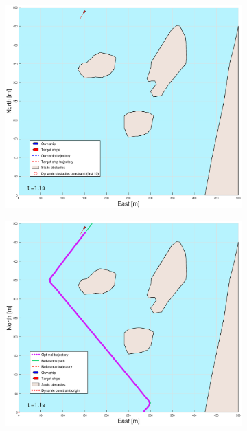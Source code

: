 \clearpage
\begin{figure}[!b] %
    \begin{subfigure}[b]{0.49\textwidth}
        \centering
        \includegraphics[width=\textwidth]{Images/Figures/Helloya/_Simple_1fig1_time=1}
    \end{subfigure}
    \hfill
    \begin{subfigure}[b]{0.499\textwidth}
        \centering
        \includegraphics[width=\textwidth]{Images/Figures/Helloya/_Simple_1fig999_time=1}

\end{subfigure}
\end{figure}
